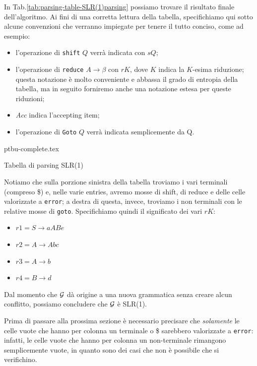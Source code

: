 \documentclass[class=book, crop=false, oneside, 12pt]{standalone}
\begin{document}
In Tab.\ref{tab:parsing-table-SLR(1)parsing} possiamo trovare il risultato finale dell'algoritmo. Ai fini di una corretta lettura della tabella, specifichiamo qui sotto alcune convenzioni che verranno impiegate per tenere il tutto conciso, come ad esempio:
\begin{itemize}
    \item l'operazione di \texttt{shift} \(Q\) verrà indicata con \(sQ\);
    \item l'operazione di \texttt{reduce} \(A \rightarrow \beta\) con \(rK\), dove \(K\) indica la \(K\)-esima riduzione; questa notazione è molto conveniente e abbassa il grado di entropia della tabella, ma in seguito forniremo anche una notazione estesa per queste riduzioni;
    \item \emph{Acc} indica l'accepting item;
    \item l'operazione di \texttt{Goto} \(Q\) verrà indicata semplicemente da Q.
\end{itemize}
\begin{table}[H]
    \centering
    {ptbu-complete.tex}
    \caption{Tabella di parsing SLR(1)}
    \label{tab:parsing-table-SLR(1)parsing}
\end{table}
Notiamo che sulla porzione sinistra della tabella troviamo i vari terminali (compreso \$) e, nelle varie entries, avremo mosse di shift, di reduce e delle celle valorizzate a \texttt{error}; a destra di questa, invece, troviamo i non terminali con le relative mosse di \texttt{goto}.
Specifichiamo quindi il significato dei vari \(rK\):
\begin{itemize}
    \item \(r1 = S \to aABe\)
    \item \(r2 = A \to Abc\)
    \item \(r3 = A \to b\)
    \item \(r4 = B \to d\)
\end{itemize}
Dal momento che \(\mathcal{G}\) dà origine a una nuova grammatica senza creare alcun conflitto, possiamo concludere che \(\mathcal{G}\) è SLR(1).

Prima di passare alla prossima sezione è necessario precisare che \emph{solamente} le celle vuote che hanno per colonna un terminale o \$ sarebbero valorizzate a \texttt{error}: infatti, le celle vuote che hanno per colonna un non-terminale rimangono semplicemente vuote, in quanto sono dei casi che non è possibile che si verifichino. 
\end{document}
